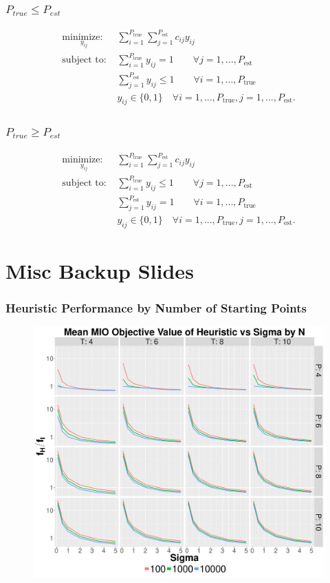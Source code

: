 \documentclass{beamer}
\begin{document}
\begin{frame}[noframenumbering]
\frametitle{$P_{true} \leq P_{est}$}
\begin{align*}
\underset{y_{ij}}{\text{minimize: }} & \sum_{i=1}^{P_{\text{true}}} \sum_{j=1}^{P_{\text{est}}} c_{ij}y_{ij}\\
\text{subject to: }	& \sum_{i=1}^{P_{\text{true}}} y_{ij} = 1 \qquad \forall j = 1,...,P_{\text{est}} \nonumber \\
				& \sum_{j=1}^{P_{\text{est}}} y_{ij} \leq 1 \qquad \forall i = 1,...,P_{\text{true}}\nonumber \\
				& y_{ij} \in \{0,1\} \quad \forall i = 1,...,P_{\text{true}},j = 1,...,P_{\text{est}}. \nonumber
\end{align*}
\end{frame}

\begin{frame}[noframenumbering]
\frametitle{$P_{true} \geq P_{est}$}
\begin{align*}
\underset{y_{ij}}{\text{minimize: }} & \sum_{i=1}^{P_{\text{true}}} \sum_{j=1}^{P_{\text{est}}} c_{ij}y_{ij}\\
\text{subject to: }	& \sum_{i=1}^{P_{\text{true}}} y_{ij} \leq 1 \qquad \forall  j = 1,...,P_{\text{est}}\nonumber \\
				& \sum_{j=1}^{P_{\text{est}}} y_{ij} = 1 \qquad \forall i = 1,...,P_{\text{true}} \nonumber \\
				& y_{ij} \in \{0,1\} \quad \forall i = 1,...,P_{\text{true}},j = 1,...,P_{\text{est}}. \nonumber
\end{align*}
\end{frame}

\section{Misc Backup Slides}
\begin{frame}[noframenumbering]
\frametitle{Heuristic Performance by Number of Starting Points}
\begin{figure}[ht]
  \centering
  \includegraphics[width=.7\columnwidth]{../Figures/Basic_Heuristic_Objective}
\end{figure}
\end{frame}
\end{document}
